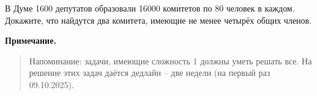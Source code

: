 \documentclass{article}
\begin{document}
\begin{task}[3]
В Думе 1600 депутатов образовали 16000 комитетов по 80 человек в каждом. Докажите, что найдутся два комитета, имеющие не менее четырёх общих членов.
\end{task}

\vspace{1.5em}
\noindent\textbf{Примечание.}
\begin{quote}
Напоминание: задачи, имеющие сложность 1 должны уметь решать все. На решение этих задач даётся дедлайн – две недели (на первый раз 09.10.2025).
\end{quote}
\end{document}
